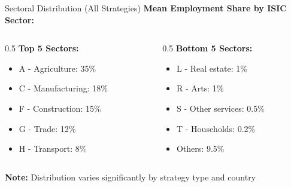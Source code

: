 \documentclass[10pt]{beamer}
\begin{document}
\begin{frame}{Sectoral Distribution (All Strategies)}
\textbf{Mean Employment Share by ISIC Sector:}

\vspace{0.3cm}

\begin{columns}
\begin{column}{0.5\textwidth}
\textbf{Top 5 Sectors:}
\begin{itemize}
    \item A - Agriculture: 35\%
    \item C - Manufacturing: 18\%
    \item F - Construction: 15\%
    \item G - Trade: 12\%
    \item H - Transport: 8\%
\end{itemize}
\end{column}
\begin{column}{0.5\textwidth}
\textbf{Bottom 5 Sectors:}
\begin{itemize}
    \item L - Real estate: 1\%
    \item R - Arts: 1\%
    \item S - Other services: 0.5\%
    \item T - Households: 0.2\%
    \item Others: 9.5\%
\end{itemize}
\end{column}
\end{columns}

\vspace{0.5cm}

\textbf{Note:} Distribution varies significantly by strategy type and country
\end{frame}
\end{document}
